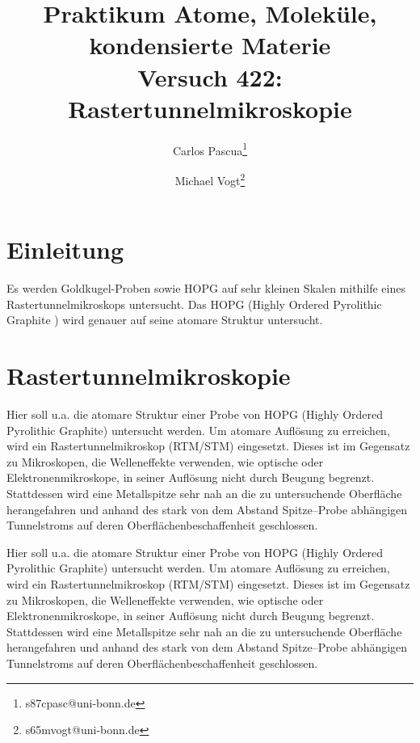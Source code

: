 \documentclass{article}
\title{Praktikum Atome, Moleküle, kondensierte Materie \\ Versuch 422: Rastertunnelmikroskopie}
\author[1]{Carlos Pascua\thanks{s87cpasc@uni-bonn.de}}
\author[1]{Michael Vogt\thanks{s65mvogt@uni-bonn.de}}
\affil[1]{Uni Bonn}
\newcommand{\defc}{black}
\newcommand{\colorT}[2][blue]{\color{#1}{#2}\color{\defc}}
\newcommand{\todo}[1]{\colorT[red]{\textbf{(#1)}}}
\begin{document}
\maketitle
\tableofcontents
\newpage
{}

\pagestyle{fancy}
\fancyhead[R]{\thepage}
\fancyhead[L]{\leftmark}

\section*{Einleitung}
Es werden Goldkugel-Proben sowie HOPG auf sehr kleinen Skalen mithilfe eines Rastertunnelmikroskops untersucht.
Das HOPG (Highly Ordered Pyrolithic Graphite \cite{Anleitung}) wird genauer auf seine atomare Struktur untersucht.

\section{Rastertunnelmikroskopie}
Hier soll u.a. die atomare Struktur einer Probe von HOPG (Highly Ordered Pyrolithic Graphite) untersucht werden.
Um atomare Auflösung zu erreichen, wird ein Rastertunnelmikroskop (RTM/STM) eingesetzt.
Dieses ist im Gegensatz zu Mikroskopen, die Welleneffekte verwenden, wie optische oder Elektronenmikroskope,
in seiner Auflösung nicht durch Beugung begrenzt.
Stattdessen wird eine Metallspitze sehr nah an die zu untersuchende Oberfläche 
herangefahren und anhand des stark von dem Abstand Spitze--Probe abhängigen Tunnelstroms auf deren Oberflächenbeschaffenheit geschlossen.

Hier soll u.a. die atomare Struktur einer Probe von HOPG (Highly Ordered Pyrolithic Graphite) untersucht werden.
Um atomare Auflösung zu erreichen, wird ein Rastertunnelmikroskop (RTM/STM) eingesetzt.
Dieses ist im Gegensatz zu Mikroskopen, die Welleneffekte verwenden, wie optische oder Elektronenmikroskope,
in seiner Auflösung nicht durch Beugung begrenzt.
Stattdessen wird eine Metallspitze sehr nah an die zu untersuchende Oberfläche 
herangefahren und anhand des stark von dem Abstand Spitze--Probe abhängigen Tunnelstroms auf deren Oberflächenbeschaffenheit geschlossen.

\end{document}
